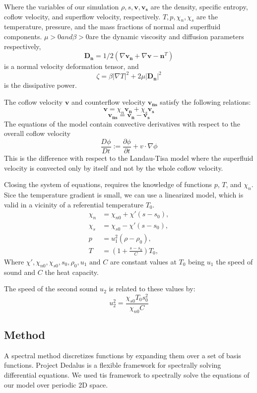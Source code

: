\documentclass{article}
\begin{document}
Where the variables of our simulation  \(\rho, s, \mathbf{v}, \mathbf{v_s}\) are the density, specific entropy, coflow velocity, and superflow velocity, respectively.
\(T, p, \chi_n, \chi_s\) are the temperature, pressure, and the mass fractions of normal and superfluid components. 
\(\mu > 0 and \beta>0 \)are the dynamic viscosity and diffusion parameters respectively, 
\[\mathbf{D_n} = 1/2(\nabla \mathbf{v_n} +  \nabla \mathbf{v-n}^T)\] 
is a normal velocity deformation tensor, and
\[\zeta = \beta |\nabla T|^2 + 2 \mu |\mathbf{D_n}|^2\]
is the dissipative power.


The coflow velocity \(\mathbf{v}\) and counterflow velocity \( \mathbf{v_{ns}}\) satisfy the following relations:
\[\mathbf{v} = \chi_n \mathbf{v_n} + \chi_s \mathbf{v_s}\]
\[\mathbf{v_{ns}}  = \mathbf{v_n} - \mathbf{v_s}\]
The equations of the model contain convective derivatives with respect to the overall coflow velocity
\[\frac{D\phi}{Dt} := \frac{\partial \phi}{\partial t} + v \cdot \nabla \phi\]
This is the difference with respect to the Landau-Tisa model where the superfluid velocity is convected only by itself and not by the whole coflow velocity.

Closing the system of equations, requires the knowledge of functions \(p\), \(T\), and \(\chi_n\).
Sice the temperature gradient is small, we can use a linearized model, which is valid in a vicinity of a referential temperature \(T_0\).
\begin{align}
    \chi_n &= \chi_{n0} + \chi'(s-s_0),\\
    \chi_s &= \chi_{s0} - \chi'(s-s_0),\\
    p &= u_1^2(\rho-\rho_0), \\
    T &= (1+\frac{s-s_0}{C})T_0,
\end{align}
Where \(\chi', \chi_{n0}, \chi_{s0}, s_0, \rho_0, u_1 \text{ and } C\) are constant values at \(T_0\) being 
\(u_1\) the speed of sound and \(C\) the heat capacity. 

The speed of the second sound \(u_2\) is related to these values by:
\[u_2^2 = \frac{\chi_{s0}T_0s_0^2}{\chi_{n0}C}\]
\subsection{Method}
A spectral method discretizes functions by expanding them over a set of basis functions.
Project Dedalus\cite{Dedalus} is a flexible framework for spectrally solving differential equations. We used tis framework to spectrally solve the equations of our model over periodic 2D space.
\end{document}
